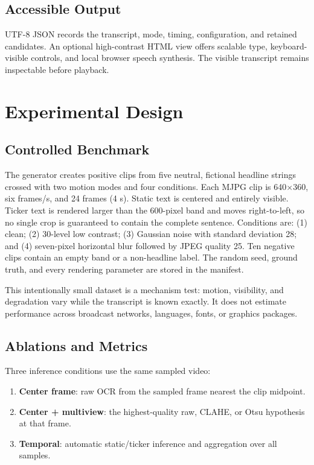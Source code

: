 \documentclass[conference]{IEEEtran}
\begin{document}
\subsection{Accessible Output}

UTF-8 JSON records the transcript, mode, timing, configuration, and retained candidates.  An
optional high-contrast HTML view offers scalable type, keyboard-visible controls, and local
browser speech synthesis.  The visible transcript remains inspectable before playback.

\section{Experimental Design}

\subsection{Controlled Benchmark}

The generator creates \PositiveClips{} positive clips from five neutral, fictional headline
strings crossed with two motion modes and four conditions.  Each MJPG clip is 640$\times$360,
six frames/s, and 24 frames (4 s).  Static text is centered and entirely visible.  Ticker text is
rendered larger than the 600-pixel band and moves right-to-left, so no single crop is guaranteed
to contain the complete sentence.  Conditions are: (1) clean; (2) 30-level low contrast;
(3) Gaussian noise with standard deviation 28; and (4) seven-pixel horizontal blur followed by
JPEG quality 25.  Ten negative clips contain an empty band or a non-headline label.  The random
seed, ground truth, and every rendering parameter are stored in the manifest.

This intentionally small dataset is a mechanism test: motion, visibility, and degradation vary
while the transcript is known exactly.  It does not estimate performance across broadcast
networks, languages, fonts, or graphics packages.

\subsection{Ablations and Metrics}

Three inference conditions use the same sampled video:
\begin{enumerate}
    \item \textbf{Center frame}: raw OCR from the sampled frame nearest the clip midpoint.
    \item \textbf{Center + multiview}: the highest-quality raw, CLAHE, or Otsu hypothesis at
    that frame.
    \item \textbf{Temporal}: automatic static/ticker inference and aggregation over all samples.
\end{enumerate}
\end{document}
